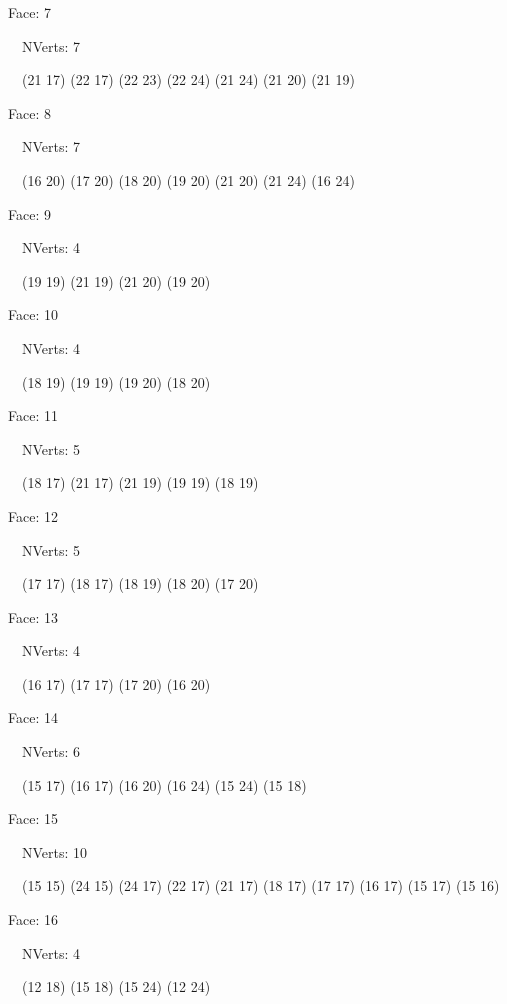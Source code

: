 \documentclass{article}
\begin{document}
{\footnotesize 

Face: 7

\   \    NVerts: 7

 \   \   (21 17) (22 17) (22 23) (22 24) (21 24) (21 20) (21 19)}

{\footnotesize 

Face: 8

\   \    NVerts: 7

 \   \   (16 20) (17 20) (18 20) (19 20) (21 20) (21 24) (16 24)}

{\footnotesize 

Face: 9

\   \    NVerts: 4

 \   \   (19 19) (21 19) (21 20) (19 20)}

{\footnotesize 

Face: 10

\   \    NVerts: 4

 \   \   (18 19) (19 19) (19 20) (18 20)}

{\footnotesize 

Face: 11

\   \    NVerts: 5

 \   \   (18 17) (21 17) (21 19) (19 19) (18 19)}

{\footnotesize 

Face: 12

\   \    NVerts: 5

 \   \   (17 17) (18 17) (18 19) (18 20) (17 20)}

{\footnotesize 

Face: 13

\   \    NVerts: 4

 \   \   (16 17) (17 17) (17 20) (16 20)}

{\footnotesize 

Face: 14

\   \    NVerts: 6

 \   \   (15 17) (16 17) (16 20) (16 24) (15 24) (15 18)}

{\footnotesize 

Face: 15

\   \    NVerts: 10

 \   \   (15 15) (24 15) (24 17) (22 17) (21 17) (18 17) (17 17) (16 17) (15 17) (15 16)}

{\footnotesize 

Face: 16

\   \    NVerts: 4

 \   \   (12 18) (15 18) (15 24) (12 24)}
\end{document}
